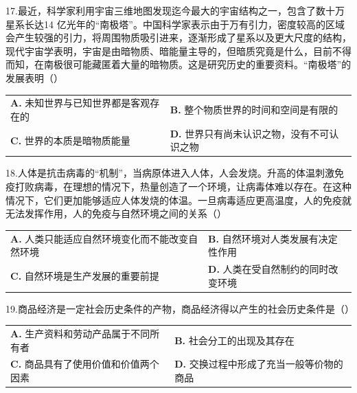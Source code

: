 \documentclass[UTF8,11pt]{ctexart}
\begin{document}
17.最近，科学家利用宇宙三维地图发现迄今最大的宇宙结构之一，包含了数十万星系长达14 亿光年的“南极塔”。中国科学家表示由于万有引力，密度较高的区域会产生较强的引力，将周围物质吸引进来，逐渐形成了星系以及更大尺度的结构，现代宇宙学表明，宇宙是由暗物质、暗能量主导的，但暗质究竟是什么，目前不得而知，在南极很可能藏匿着大量的暗物质。这是研究历史的重要资料。“南极塔”的发展表明（）


\begin{center}\begin{tabular}{>{\raggedright\arraybackslash}p{\dimexpr(\linewidth-4\tabcolsep)/2\relax}>{\raggedright\arraybackslash}p{\dimexpr(\linewidth-4\tabcolsep)/2\relax}}
\textbf{A.} 未知世界与已知世界都是客观存在的 & \textbf{B.} 整个物质世界的时间和空间是有限的\\[.35em]
\textbf{C.} 世界的本质是暗物质能量 & \textbf{D.} 世界只有尚未认识之物，没有不可认识之物\\[.35em]\end{tabular}\end{center}

18.人体是抗击病毒的“机制”，当病原体进入人体，人会发烧。升高的体温刺激免疫打败病毒，在理想的情况下，热量创造了一个环境，让病毒体难以存在。在这种情况下，它们更加能够适应人体发烧的体温。一旦病毒适应更高温度，人的免疫就无法发挥作用，人的免疫与自然环境之间的关系（）


\begin{center}\begin{tabular}{>{\raggedright\arraybackslash}p{\dimexpr(\linewidth-4\tabcolsep)/2\relax}>{\raggedright\arraybackslash}p{\dimexpr(\linewidth-4\tabcolsep)/2\relax}}
\textbf{A.} 人类只能适应自然环境变化而不能改变自然环境 & \textbf{B.} 自然环境对人类发展有决定性作用\\[.35em]
\textbf{C.} 自然环境是生产发展的重要前提 & \textbf{D.} 人类在受自然制约的同时改变环境\\[.35em]\end{tabular}\end{center}

19.商品经济是一定社会历史条件的产物，商品经济得以产生的社会历史条件是（）


\begin{center}\begin{tabular}{>{\raggedright\arraybackslash}p{\dimexpr(\linewidth-4\tabcolsep)/2\relax}>{\raggedright\arraybackslash}p{\dimexpr(\linewidth-4\tabcolsep)/2\relax}}
\textbf{A.} 生产资料和劳动产品属于不同所有者 & \textbf{B.} 社会分工的出现及其存在\\[.35em]
\textbf{C.} 商品具有了使用价值和价值两个因素 & \textbf{D.} 交换过程中形成了充当一般等价物的商品\\[.35em]\end{tabular}\end{center}
\end{document}
